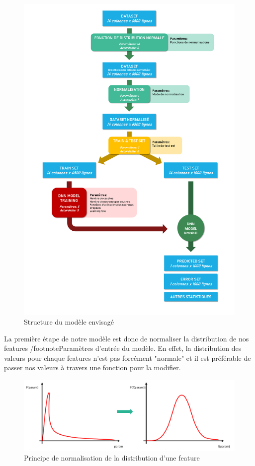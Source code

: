 \begin{figure}[H]
    \centering
    \includegraphics[width=\linewidth]{images/graphs/struc_model_dnn.png}
    \captionsetup{justification=centering}
    \caption{Structure du modèle envisagé}
    \label{fig:strcu_dnn}
\end{figure}

La première étape de notre modèle est donc de normaliser la distribution de nos features /footnote{Paramètres d'entrée du modèle}. En effet, la distribution des valeurs pour chaque features n'est pas forcément "normale" et il est préférable de passer nos valeurs à travers une fonction pour la modifier.

\begin{figure}[H]
    \centering
    \includegraphics[width=\linewidth]{images/graphs/fct_histo.png}
    \captionsetup{justification=centering}
    \caption{Principe de normalisation de la distribution d'une feature}
    \label{fig:fct_repartition}
\end{figure}

